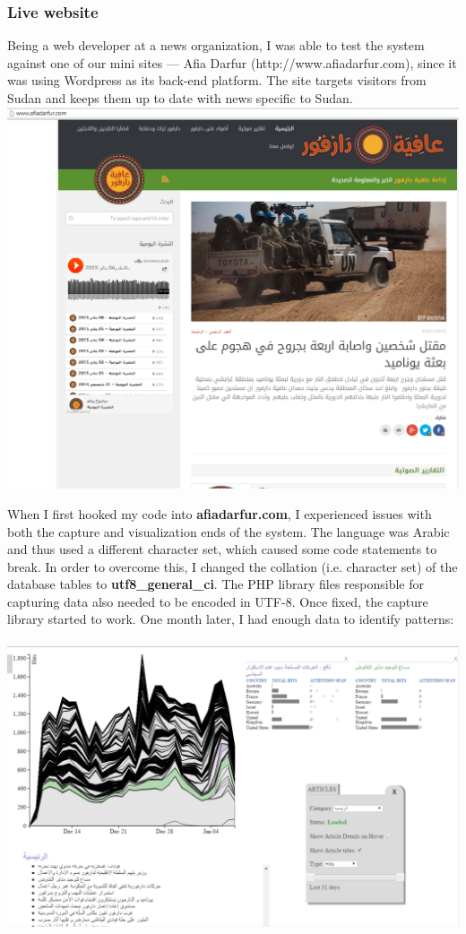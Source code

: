 \documentclass[12pt]{article}
\begin{document}
{\newpage

\subsubsection{Live website}
Being a web developer at a news organization, I was able to test the system against one of our mini sites --- Afia Darfur (http://www.afiadarfur.com), since it was using Wordpress as its back-end platform. The site targets visitors from Sudan and keeps them up to date with news specific to Sudan. \\

\noindent\includegraphics[scale=0.4]{img/afiadarfur_main} \\

\newpage

When I first hooked my code into \textbf{afiadarfur.com}, I experienced issues with both the capture and visualization ends of the system. The language was Arabic and thus used a different character set, which caused some code statements to break. In order to overcome this, I changed the collation (i.e. character set) of the database tables to \textbf{utf8\_general\_ci}. The PHP library files responsible for capturing data also needed to be encoded in UTF-8. Once fixed, the capture library started to work. One month later, I had enough data to identify patterns: \\ \\
\noindent\includegraphics[scale=0.5]{img/afiadarfur_main_viz}

}
\end{document}
